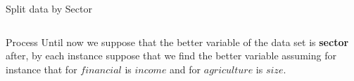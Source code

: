 \documentclass{beamer}
\begin{document}
\begin{frame}{Split data by Sector}
\begin{columns} 
    \begin{column}{.5\textwidth}
\begin{table}[]
\centering
{}
\caption{Financial}
\label{tab:my-table}
\end{table}


    \end{column}
    \begin{column}{.5\textwidth}
\begin{table}[]
\centering
{}
\caption{Agricultural}
\label{tab:my-table}
\end{table}
\end{column} 
\end{columns}
\end{frame}



\begin{frame}{Process}
Until now we suppose that the better variable of the data set is \textbf{sector} after, by each instance suppose that we find the better variable  assuming for instance that for $financial$ is $income$ and for $agriculture$ is $size$.
\end{frame}
\end{document}
